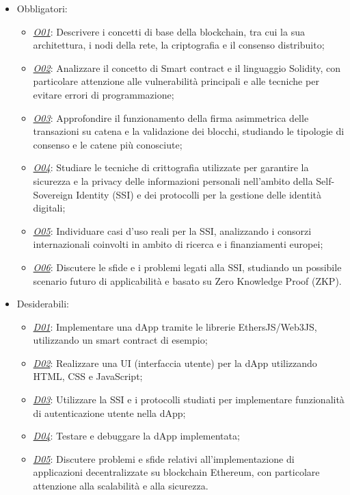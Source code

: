 \begin{itemize}

    \item Obbligatori:
        \begin{itemize}
            \item \underline{\textit{O01}}: Descrivere i concetti di base della blockchain, tra cui la sua architettura, i nodi della rete, la criptografia e il consenso distribuito;
            \item \underline{\textit{O02}}: Analizzare il concetto di Smart contract e il linguaggio Solidity, con particolare attenzione alle vulnerabilità principali e alle tecniche per evitare errori di programmazione;
            \item \underline{\textit{O03}}: Approfondire il funzionamento della firma asimmetrica delle transazioni su catena e la validazione dei blocchi, studiando le tipologie di consenso e le catene più conosciute;
            \item \underline{\textit{O04}}: Studiare le tecniche di crittografia utilizzate per garantire la sicurezza e la privacy delle informazioni personali nell'ambito della Self-Sovereign Identity (SSI) e dei protocolli per la gestione delle identità digitali;
            \item \underline{\textit{O05}}: Individuare casi d'uso reali per la SSI, analizzando i consorzi internazionali coinvolti in ambito di ricerca e i finanziamenti europei;
            \item \underline{\textit{O06}}: Discutere le sfide e i problemi legati alla SSI, studiando un possibile scenario futuro di applicabilità e basato su Zero Knowledge Proof (ZKP).
        \end{itemize}

    \item Desiderabili:
        \begin{itemize}
            \item \underline{\textit{D01}}: Implementare una dApp tramite le librerie EthersJS/Web3JS, utilizzando un smart contract di esempio;
            \item \underline{\textit{D02}}: Realizzare una UI (interfaccia utente) per la dApp utilizzando HTML, CSS e JavaScript;
            \item \underline{\textit{D03}}: Utilizzare la SSI e i protocolli studiati per implementare funzionalità di autenticazione utente nella dApp;
            \item \underline{\textit{D04}}: Testare e debuggare la dApp implementata;
            \item \underline{\textit{D05}}: Discutere problemi e sfide relativi all'implementazione di applicazioni decentralizzate su blockchain Ethereum, con particolare attenzione alla scalabilità e alla sicurezza.
        \end{itemize}


\end{itemize}
